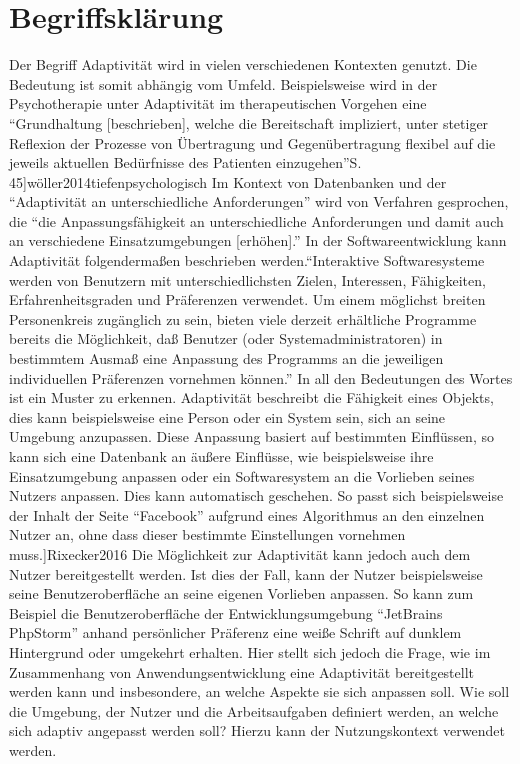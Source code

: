 \documentclass[12pt, paper=a4, bibtotoc, toc=listof, headsepline=true]{scrreprt}
\renewcommand{\smfootcite}[2][2]{\relax}
\begin{document}
		\section{Begriffsklärung}
		Der Begriff Adaptivität wird in vielen verschiedenen Kontexten genutzt. Die Bedeutung ist somit abhängig vom Umfeld. Beispielsweise wird in der Psychotherapie unter Adaptivität im therapeutischen Vorgehen eine \enquote{Grundhaltung [beschrieben], welche die Bereitschaft impliziert, unter stetiger Reflexion der Prozesse von Übertragung und Gegenübertragung flexibel auf die jeweils aktuellen Bedürfnisse des Patienten einzugehen}\smfootcite[][S. 45]{wöller2014tiefenpsychologisch} Im Kontext von Datenbanken und der \enquote{Adaptivität an unterschiedliche Anforderungen} wird von Verfahren gesprochen, die \enquote{die Anpassungsfähigkeit an unterschiedliche Anforderungen und damit auch an verschiedene Einsatzumgebungen [erhöhen].}\cite[][S. 112]{loeser2013web}
		In der Softwareentwicklung kann Adaptivität folgendermaßen beschrieben werden.\enquote{Interaktive Softwaresysteme werden von Benutzern mit unterschiedlichsten Zielen, Interessen, Fähigkeiten, Erfahrenheitsgraden und Präferenzen verwendet. Um einem möglichst breiten Personenkreis zugänglich zu sein, bieten viele derzeit erhältliche Programme bereits die Möglichkeit, daß Benutzer (oder Systemadministratoren) in bestimmtem Ausmaß eine Anpassung des Programms an die jeweiligen individuellen Präferenzen vornehmen können.}\smfootcite[S. 1]{Kobsa1993}
		\newline In all den Bedeutungen des Wortes ist ein Muster zu erkennen. Adaptivität beschreibt die Fähigkeit eines Objekts, dies kann beispielsweise eine Person oder ein System sein, sich an seine Umgebung anzupassen. Diese Anpassung basiert auf bestimmten Einflüssen, so kann sich eine Datenbank an äußere Einflüsse, wie beispielsweise ihre Einsatzumgebung anpassen oder ein Softwaresystem an die Vorlieben seines Nutzers anpassen. Dies kann automatisch geschehen. So passt sich beispielsweise der Inhalt der Seite \enquote{Facebook} aufgrund eines Algorithmus an den einzelnen Nutzer an, ohne dass dieser bestimmte Einstellungen vornehmen muss.\smfootcite[ vgl.][]{Rixecker2016} Die Möglichkeit zur Adaptivität kann jedoch auch dem Nutzer bereitgestellt werden. Ist dies der Fall, kann der Nutzer beispielsweise seine Benutzeroberfläche an seine eigenen Vorlieben anpassen. So kann zum Beispiel die Benutzeroberfläche der Entwicklungsumgebung \enquote{JetBrains PhpStorm} anhand persönlicher Präferenz eine weiße Schrift auf dunklem Hintergrund oder umgekehrt erhalten.
		\newline
		Hier stellt sich jedoch die Frage, wie im Zusammenhang von Anwendungsentwicklung eine Adaptivität bereitgestellt werden kann und insbesondere, an welche Aspekte sie sich anpassen soll. Wie soll die Umgebung, der Nutzer und die Arbeitsaufgaben definiert werden, an welche sich adaptiv angepasst werden soll? Hierzu kann der Nutzungskontext verwendet werden.
\end{document}
